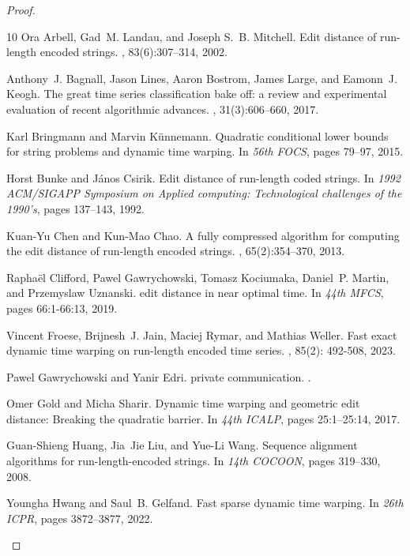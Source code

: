 \documentclass[10pt,a4paper]{article}
\begin{document}
\begin{proof}
\begin{thebibliography}{10}
Ora Arbell, Gad~M. Landau, and Joseph S.~B. Mitchell.
\newblock Edit distance of run-length encoded strings.
, 83(6):307--314, 2002.

Anthony~J. Bagnall, Jason Lines, Aaron Bostrom, James Large, and Eamonn~J.
  Keogh.
\newblock The great time series classification bake off: a review and
  experimental evaluation of recent algorithmic advances.
, 31(3):606--660, 2017.

Karl Bringmann and Marvin K{\"u}nnemann.
\newblock Quadratic conditional lower bounds for string problems and dynamic
  time warping.
\newblock In {\em 56th {FOCS}}, pages 79--97, 2015.

Horst Bunke and J{\'a}nos Csirik.
\newblock Edit distance of run-length coded strings.
\newblock In {\em 1992 ACM/SIGAPP Symposium on Applied computing: Technological
  challenges of the 1990's}, pages 137--143, 1992.

Kuan-Yu Chen and Kun-Mao Chao.
\newblock A fully compressed algorithm for computing the edit distance of
  run-length encoded strings.
, 65(2):354--370, 2013.

Rapha{\"e}l Clifford, Pawel Gawrychowski, Tomasz Kociumaka, Daniel~P. Martin,
  and Przemyslaw Uznanski.
 edit distance in near optimal time.
\newblock In {\em 44th {MFCS}}, pages 66:1-66:13, 2019.

Vincent Froese, Brijnesh~J. Jain, Maciej Rymar, and Mathias Weller.
\newblock Fast exact dynamic time warping on run-length encoded time series.
, 85(2): 492-508, 2023.

Pawel Gawrychowski and Yanir Edri.
\newblock private communication.
.

Omer Gold and Micha Sharir.
\newblock Dynamic time warping and geometric edit distance: Breaking the
  quadratic barrier.
\newblock In {\em 44th {ICALP}}, pages 25:1--25:14, 2017.

Guan{-}Shieng Huang, Jia~Jie Liu, and Yue{-}Li Wang.
\newblock Sequence alignment algorithms for run-length-encoded strings.
\newblock In {\em 14th {COCOON}}, pages 319--330, 2008.

Youngha Hwang and Saul~B. Gelfand.
\newblock Fast sparse dynamic time warping.
\newblock In {\em 26th {ICPR}}, pages 3872--3877, 2022.


\end{thebibliography}
\end{proof}
\end{document}
